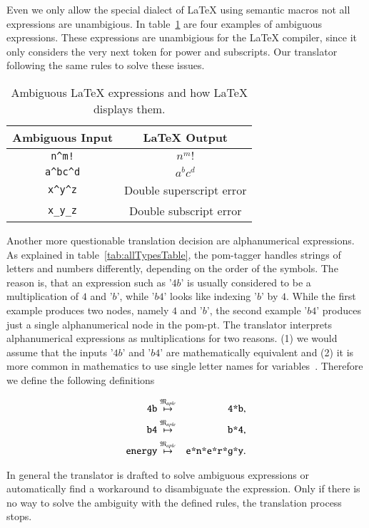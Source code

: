 Even we only allow the special dialect of \LaTeX{} using semantic macros not all expressions are unambigious. In table~\ref{tab:amb-latex} are four examples of ambiguous expressions. These expressions are unambigious for the \LaTeX{} compiler, since it only considers the very next token for power and subscripts. Our translator following the same rules to solve these issues.

\begin{table}[ht]
\centering
\begin{tabular}{cc}
	\hline
	Ambiguous Input & \LaTeX{} Output\\
	\hline
	\verb|n^m!| & $n^m!$\\
	\verb|a^bc^d| & $a^bc^d$\\
	\verb|x^y^z| & Double superscript error\\
	\verb|x_y_z| & Double subscript error\\
	\hline
\end{tabular}
\caption{Ambiguous \LaTeX{} expressions and how \LaTeX{} displays them.}
\label{tab:amb-latex}
\end{table}

Another more questionable translation decision are alphanumerical expressions. As explained in table~\ref{tab:allTypesTable}, the \gls*{pom}-tagger handles strings of letters and numbers differently, depending on the order of the symbols. The reason is, that an expression such as '$4b$' is usually considered to be a multiplication of $4$ and '$b$', while '$b4$' looks like indexing '$b$' by $4$. While the first example produces two nodes, namely $4$ and '$b$', the second example '$b4$' produces just a single alphanumerical node in the \gls*{pom-pt}. The translator interprets alphanumerical expressions as multiplications for two reasons. (1) we would assume that the inputs '$4b$' and '$b4$' are mathematically equivalent and (2) it is more common in mathematics to use single letter names for variables~\parencite{Notation:History}. Therefore we define the following definitions

\begin{eqnarray*}
\verb|4b| & \overset{\langMaple}{\mapsto} & \verb|4*b|,\\
\verb|b4| & \overset{\langMaple}{\mapsto} & \verb|b*4|,\\
\verb|energy| & \overset{\langMaple}{\mapsto} & \verb|e*n*e*r*g*y|.
\end{eqnarray*}

In general the translator is drafted to solve ambiguous expressions or automatically find a workaround to disambiguate the expression. Only if there is no way to solve the ambiguity with the defined rules, the translation process stops.

